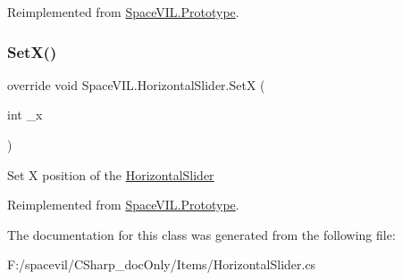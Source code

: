 Reimplemented from \mbox{\hyperlink{class_space_v_i_l_1_1_prototype_ae96644a6ace490afb376fb542161e541}{Space\+V\+I\+L.\+Prototype}}.

\mbox{\label{class_space_v_i_l_1_1_horizontal_slider_ab674da8d7310f5b68f9c85975073b076}} 
\subsubsection{\texorpdfstring{Set\+X()}{SetX()}}
{\footnotesize\ttfamily override void Space\+V\+I\+L.\+Horizontal\+Slider.\+SetX (\begin{DoxyParamCaption}\item[{int}]{\+\_\+x }\end{DoxyParamCaption})\hspace{0.3cm}{\ttfamily [virtual]}}



Set X position of the \mbox{\hyperlink{class_space_v_i_l_1_1_horizontal_slider}{Horizontal\+Slider}} 



Reimplemented from \mbox{\hyperlink{class_space_v_i_l_1_1_prototype}{Space\+V\+I\+L.\+Prototype}}.



The documentation for this class was generated from the following file\+:\begin{DoxyCompactItemize}
\item 
F\+:/spacevil/\+C\+Sharp\+\_\+doc\+Only/\+Items/Horizontal\+Slider.\+cs\end{DoxyCompactItemize}
